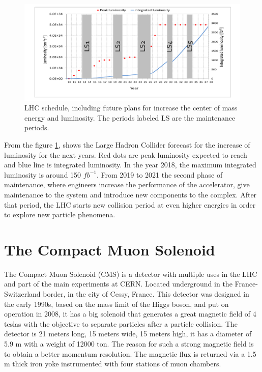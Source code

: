 \begin{figure}[!htbp]
\centering
\includegraphics[scale=0.5]{Chapter2/lum6.png}
\caption[LHC schedule, including future plans for increase the center of mass energy and luminosity. The periods labeled LS are the maintenance periods]{LHC schedule, including future plans for increase the center of mass energy and luminosity. The periods labeled LS are the maintenance periods\cite{cern3}.}
\label{lhc-lumi}
\end{figure}
From the figure \ref{lhc-lumi}, shows the Large Hadron Collider forecast for the increase of luminosity for the next years. Red dots are peak luminosity expected to reach and blue line is integrated luminosity. In the year 2018, the maximum integrated luminosity is around 150 $fb^{-1}$\cite{cern3}. From 2019 to 2021 the second phase of maintenance, where engineers increase the performance of the accelerator, give maintenance to the system and introduce new components to the complex. After that period, the LHC starts new collision period at even higher energies in order to explore new particle phenomena.

\pagebreak

\section{The Compact Muon Solenoid}	
The Compact Muon Solenoid (CMS) is a detector with multiple uses in the LHC and part of the main experiments at CERN. Located underground in the France- Switzerland border, in the city of Cessy, France.
This detector was designed in the early 1990s, based on the mass limit of the Higgs boson, and put on operation in 2008, it has a big solenoid that generates a great magnetic field of 4 teslas with the objective to separate particles after a particle collision.
 The detector is 21 meters long, 15 meters wide, 15 meters high, it has a diameter of 5.9 m with a weight of 12000 ton. The reason for such a strong magnetic field is to obtain a better momentum resolution.
 The magnetic flux is returned via a 1.5 m thick iron yoke instrumented with four stations of muon
 chambers.



